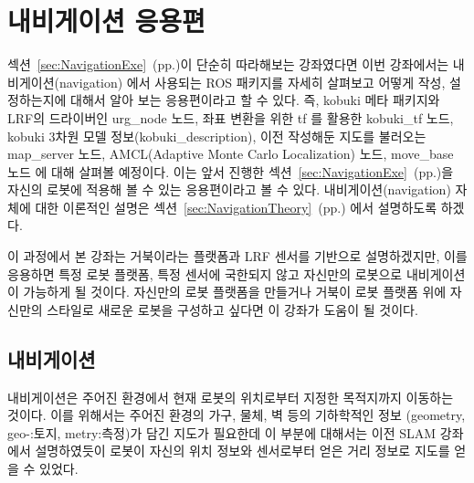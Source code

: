 
\newpage
\section{내비게이션 응용편}
\label{sec:NavigationApp}

섹션~\ref{sec:NavigationExe}~(pp.\pageref{sec:NavigationExe})이 단순히 따라해보는 강좌였다면 이번 강좌에서는 내비게이션(navigation) 에서 사용되는 ROS 패키지를 자세히 살펴보고 어떻게 작성, 설정하는지에 대해서 알아 보는 응용편이라고 할 수 있다. 즉, kobuki 메타 패키지와 LRF의 드라이버인 urg\_node 노드, 좌표 변환을 위한 tf 를 활용한 kobuki\_tf 노드, kobuki 3차원 모델 정보(kobuki\_description), 이전 작성해둔 지도를 불러오는 map\_server 노드, AMCL(Adaptive Monte Carlo Localization) 노드, move\_base 노드 에 대해 살펴볼 예정이다. 이는 앞서 진행한 섹션~\ref{sec:NavigationExe}~(pp.\pageref{sec:NavigationExe})을 자신의 로봇에 적용해 볼 수 있는 응용편이라고 볼 수 있다. 내비게이션(navigation) 자체에 대한 이론적인 설명은 섹션~\ref{sec:NavigationTheory}~(pp.\pageref{sec:NavigationTheory}) 에서 설명하도록 하겠다.

이 과정에서 본 강좌는 거북이라는 플랫폼과 LRF 센서를 기반으로 설명하겠지만, 이를 응용하면 특정 로봇 플랫폼, 특정 센서에 국한되지 않고 자신만의 로봇으로 내비게이션 이 가능하게 될 것이다. 자신만의 로봇 플랫폼을 만들거나 거북이 로봇 플랫폼 위에 자신만의 스타일로 새로운 로봇을 구성하고 싶다면 이 강좌가 도움이 될 것이다.

\subsection{내비게이션}

내비게이션은 주어진 환경에서 현재 로봇의 위치로부터 지정한 목적지까지 이동하는 것이다. 이를 위해서는 주어진 환경의 가구, 물체, 벽 등의 기하학적인 정보 (geometry, geo-:토지, metry:측정)가 담긴 지도가 필요한데 이 부분에 대해서는 이전  SLAM 강좌에서 설명하였듯이 로봇이 자신의 위치 정보와 센서로부터 얻은 거리 정보로 지도를 얻을 수 있었다. 

